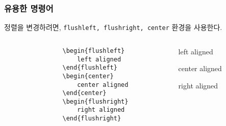 \begin{frame}[fragile]
    \frametitle{유용한 명령어}

    정렬을 변경하려면, \texttt{flushleft, flushright, center} 환경을 사용한다.


    \begin{columns}[c]
        \begin{column}{0.4\textwidth}
            \begin{verbatim}
                \begin{flushleft}
                    left aligned
                \end{flushleft}
                \begin{center}
                    center aligned
                \end{center}
                \begin{flushright}
                    right aligned
                \end{flushright}
            \end{verbatim}
        \end{column}
        \begin{column}{0.4\textwidth}
            \begin{flushleft}
                left aligned
            \end{flushleft}
            \begin{center}
                center aligned
            \end{center}
            \begin{flushright}
                right aligned
            \end{flushright}
        \end{column}
    \end{columns}

\end{frame}


